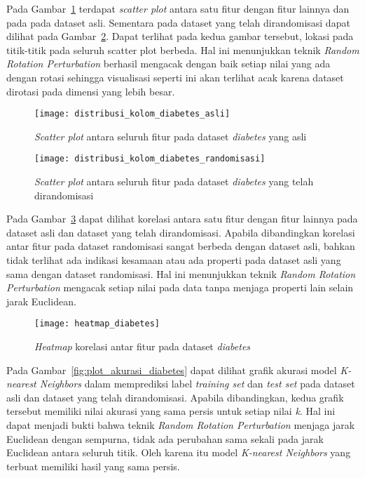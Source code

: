 Pada Gambar~\ref{fig:distribusi_kolom_diabetes_asli} terdapat \textit{scatter plot} antara satu fitur dengan fitur lainnya dan pada pada dataset asli. Sementara pada dataset yang telah dirandomisasi dapat dilihat pada Gambar~\ref{fig:distribusi_kolom_diabetes_randomisasi}. Dapat terlihat pada kedua gambar tersebut, lokasi pada titik-titik pada seluruh scatter plot berbeda. Hal ini menunjukkan teknik \textit{Random Rotation Perturbation} berhasil mengacak dengan baik setiap nilai yang ada dengan rotasi sehingga visualisasi seperti ini akan terlihat acak karena dataset dirotasi pada dimensi yang lebih besar.

\begin{figure}
	\centering
	\texttt{[image: distribusi\_kolom\_diabetes\_asli]}
	\caption{\textit{Scatter plot} antara seluruh fitur pada dataset \textit{diabetes} yang asli}
	\label{fig:distribusi_kolom_diabetes_asli}
\end{figure}

\begin{figure}
	\centering
	\texttt{[image: distribusi\_kolom\_diabetes\_randomisasi]}
	\caption{\textit{Scatter plot} antara seluruh fitur pada dataset \textit{diabetes} yang telah dirandomisasi}
	\label{fig:distribusi_kolom_diabetes_randomisasi}
\end{figure}

Pada Gambar~\ref{fig:heatmap_diabetes} dapat dilihat korelasi antara satu fitur dengan fitur lainnya pada dataset asli dan dataset yang telah dirandomisasi. Apabila dibandingkan korelasi antar fitur pada dataset randomisasi sangat berbeda dengan dataset asli, bahkan tidak terlihat ada indikasi kesamaan atau ada properti pada dataset asli yang sama dengan dataset randomisasi. Hal ini menunjukkan teknik \textit{Random Rotation Perturbation} mengacak setiap nilai pada data tanpa menjaga properti lain selain jarak Euclidean.

\begin{figure}
	\centering
	\texttt{[image: heatmap\_diabetes]}
	\caption{\textit{Heatmap} korelasi antar fitur pada dataset \textit{diabetes}}
	\label{fig:heatmap_diabetes}
\end{figure}

Pada Gambar~\ref{fig:plot_akurasi_diabetes} dapat dilihat grafik akurasi model \textit{K-nearest Neighbors} dalam memprediksi label \textit{training set} dan \textit{test set} pada dataset asli dan dataset yang telah dirandomisasi. Apabila dibandingkan, kedua grafik tersebut memiliki nilai akurasi yang sama persis untuk setiap nilai \textit{k}. Hal ini dapat menjadi bukti bahwa teknik \textit{Random Rotation Perturbation} menjaga jarak Euclidean dengan sempurna, tidak ada perubahan sama sekali pada jarak Euclidean antara seluruh titik. Oleh karena itu model \textit{K-nearest Neighbors} yang terbuat memiliki hasil yang sama persis.

